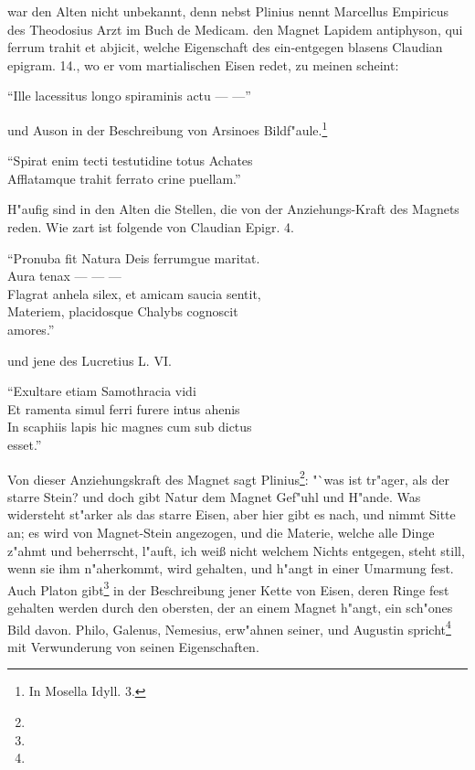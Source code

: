 \documentclass[a4paper, 11pt, oneside, polutonikogreek, german]{article}
\begin{document}
war den Alten nicht unbekannt, denn nebst Plinius nennt Marcellus Empiricus des Theodosius Arzt im Buch de Medicam. den Magnet Lapidem antiphyson, qui ferrum trahit et abjicit, welche Eigenschaft des ein-entgegen blasens Claudian epigram. 14., wo er vom martialischen Eisen redet, zu meinen scheint:

"`Ille lacessitus longo spiraminis actu --- ---"'

und Auson in der Beschreibung von Arsinoes Bildf"aule.\footnote{In Mosella Idyll. 3.}

"`Spirat enim tecti testutidine totus Achates\\
\hspace*{0.5cm} Afflatamque trahit ferrato crine puellam."'

H"aufig sind in den Alten die Stellen, die von der Anziehungs-Kraft des Magnets reden. Wie zart ist folgende von Claudian Epigr. 4.

"`Pronuba fit Natura Deis ferrumgue maritat.\\
\hspace*{0.5cm} Aura tenax --- --- ---\\
\hspace*{0.5cm} Flagrat anhela silex, et amicam saucia sentit,\\
\hspace*{0.5cm} Materiem, placidosque Chalybs cognoscit\\
\hspace*{1.5cm} amores."'

und jene des Lucretius L. VI.

"`Exultare etiam Samothracia vidi\\
\hspace*{0.5cm} Et ramenta simul ferri furere intus ahenis\\
\hspace*{0.5cm} In scaphiis lapis hic magnes cum sub dictus\\
\hspace*{1.5cm} esset."'

Von dieser Anziehungskraft des Magnet sagt Plinius\footnote{}: "`was ist tr"ager, als der starre Stein? und doch gibt Natur dem Magnet Gef"uhl und H"ande. Was widersteht st"arker als das starre Eisen, aber hier gibt es nach, und nimmt Sitte an; es wird von Magnet-Stein angezogen, und die Materie, welche alle Dinge z"ahmt und beherrscht, l"auft, ich weiß nicht welchem Nichts entgegen, steht still, wenn sie ihm n"aherkommt, wird gehalten, und h"angt in einer Umarmung fest. Auch Platon gibt\footnote{} in der Beschreibung jener Kette von Eisen, deren Ringe fest gehalten werden durch den obersten, der an einem Magnet h"angt, ein sch"ones Bild davon. Philo, Galenus, Nemesius, erw"ahnen seiner, und Augustin spricht\footnote{} mit Verwunderung von seinen Eigenschaften.
\end{document}
